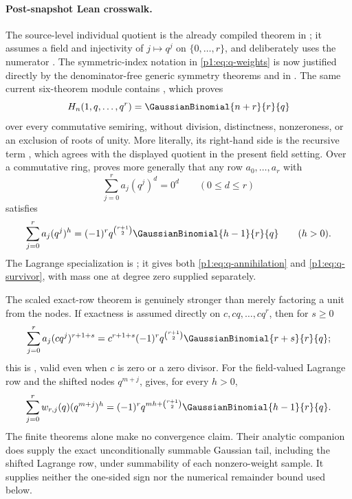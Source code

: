 \documentclass[11pt,oneside]{article}
\numberwithin{equation}{section}
\theoremstyle{definition}
\theoremstyle{remark}
\begin{document}
\paragraph{Post-snapshot Lean crosswalk.}
The source-level individual quotient is the already compiled theorem
 in
; it assumes a field and injectivity of
\(j\mapsto q^j\) on \(\{0,\ldots,r\}\), and deliberately uses the numerator
.  The symmetric-index notation in
\eqref{p1:eq:q-weights} is now justified directly by the denominator-free
generic symmetry theorems  and
 in
.  The same current six-theorem module
contains , which proves
\[
 H_n(1,q,\ldots,q^r)=\GaussianBinomial{n+r}{r}{q}
\]
over every commutative semiring, without division, distinctness, nonzeroness, or
an exclusion of roots of unity.  More literally, its right-hand side is the
recursive term , which agrees with the
displayed quotient in the present field setting.  Over a commutative ring,
 proves more generally that any row
\(a_0,\ldots,a_r\) with
\[
 \sum_{j=0}^{r}a_j(q^j)^d=0^d\qquad(0\le d\le r)
\]
satisfies
\[
 \sum_{j=0}^{r}a_j(q^j)^h
 =(-1)^r q^{\binom{r+1}{2}}\GaussianBinomial{h-1}{r}{q}
 \qquad(h>0).
\]
The Lagrange specialization is
; it gives both
\eqref{p1:eq:q-annihilation} and \eqref{p1:eq:q-survivor}, with mass one at degree
zero supplied separately.

The scaled exact-row theorem is genuinely stronger than merely factoring a
unit from the nodes.  If exactness is assumed directly on
\(c,cq,\ldots,cq^r\), then for \(s\ge0\)
\[
 \sum_{j=0}^{r}a_j(cq^j)^{r+1+s}
 =c^{r+1+s}(-1)^r q^{\binom{r+1}{2}}
   \GaussianBinomial{r+s}{r}{q};
\]
this is , valid even when
\(c\) is zero or a zero divisor.  For the field-valued Lagrange row and the
shifted nodes \(q^{m+j}\),
 gives, for every
\(h>0\),
\[
 \sum_{j=0}^{r}w_{r,j}(q)(q^{m+j})^h
 =(-1)^r q^{mh+\binom{r+1}{2}}\GaussianBinomial{h-1}{r}{q}.
\]
The finite theorems alone make no convergence claim.  Their analytic companion
 does supply the exact unconditionally summable
Gaussian tail, including the shifted Lagrange row, under summability of each
nonzero-weight sample.  It supplies neither the one-sided sign nor the numerical
remainder bound used below.
\end{document}
